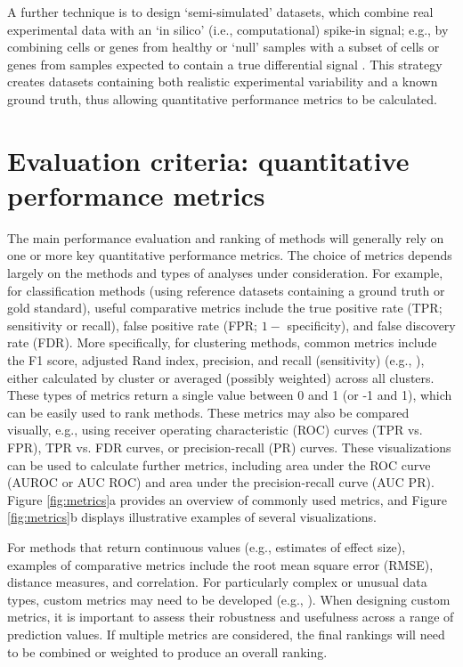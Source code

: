 \documentclass[12pt, a4paper]{article}
\begin{document}
A further technique is to design `semi-simulated' datasets, which combine real experimental data with an `in silico' (i.e., computational) spike-in signal; e.g., by combining cells or genes from healthy or `null' samples with a subset of cells or genes from samples expected to contain a true differential signal \citep{Arvaniti2017, Weber2018, Rigaill2018}. This strategy creates datasets containing both realistic experimental variability and a known ground truth, thus allowing quantitative performance metrics to be calculated.




\section*{Evaluation criteria: quantitative performance metrics}

The main performance evaluation and ranking of methods will generally rely on one or more key quantitative performance metrics. The choice of metrics depends largely on the methods and types of analyses under consideration. For example, for classification methods (using reference datasets containing a ground truth or gold standard), useful comparative metrics include the true positive rate (TPR; sensitivity or recall), false positive rate (FPR; $1 -$ specificity), and false discovery rate (FDR). More specifically, for clustering methods, common metrics include the F1 score, adjusted Rand index, precision, and recall (sensitivity) (e.g., \citep{Duo2018, Weber2016, Aghaeepour2013}), either calculated by cluster or averaged (possibly weighted) across all clusters. These types of metrics return a single value between 0 and 1 (or -1 and 1), which can be easily used to rank methods. These metrics may also be compared visually, e.g., using receiver operating characteristic (ROC) curves (TPR vs. FPR), TPR vs. FDR curves, or precision-recall (PR) curves. These visualizations can be used to calculate further metrics, including area under the ROC curve (AUROC or AUC ROC) and area under the precision-recall curve (AUC PR). Figure \ref{fig:metrics}a provides an overview of commonly used metrics, and Figure \ref{fig:metrics}b displays illustrative examples of several visualizations.

For methods that return continuous values (e.g., estimates of effect size), examples of comparative metrics include the root mean square error (RMSE), distance measures, and correlation. For particularly complex or unusual data types, custom metrics may need to be developed (e.g., \citep{Saelens2018b}). When designing custom metrics, it is important to assess their robustness and usefulness across a range of prediction values. If multiple metrics are considered, the final rankings will need to be combined or weighted to produce an overall ranking.
\end{document}
